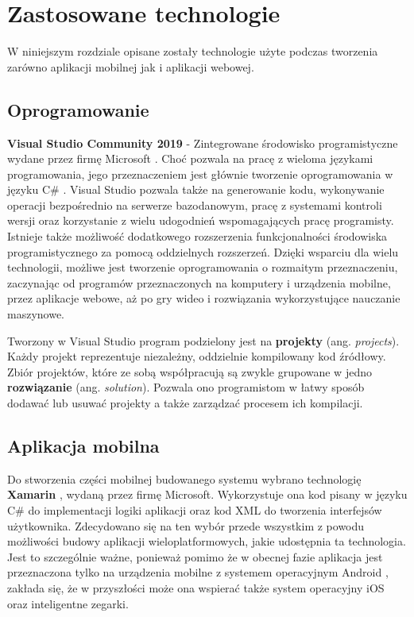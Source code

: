 \chapter{Zastosowane technologie}\label{chap:zastosowane-technologie}
W niniejszym rozdziale opisane zostały technologie użyte podczas tworzenia zarówno aplikacji mobilnej jak i aplikacji webowej.
\section{Oprogramowanie}
\textbf{Visual Studio Community 2019}\cite{visual-studio} - Zintegrowane środowisko programistyczne wydane przez firmę Microsoft \cite{microsoft}. Choć pozwala na pracę z wieloma językami programowania, jego przeznaczeniem jest głównie tworzenie oprogramowania w języku C\# \cite{csharp}. Visual Studio pozwala także na generowanie kodu, wykonywanie operacji bezpośrednio na serwerze bazodanowym, pracę z systemami kontroli wersji oraz korzystanie z wielu udogodnień wspomagających pracę programisty. Istnieje także możliwość dodatkowego rozszerzenia funkcjonalności środowiska programistycznego za pomocą oddzielnych rozszerzeń. Dzięki wsparciu dla wielu technologii, możliwe jest tworzenie oprogramowania o rozmaitym przeznaczeniu, zaczynając od programów przeznaczonych na komputery i urządzenia mobilne, przez aplikacje webowe, aż po gry wideo i rozwiązania wykorzystujące nauczanie maszynowe.

Tworzony w Visual Studio program podzielony jest na \textbf{projekty} (ang. \textit{projects}). Każdy projekt reprezentuje niezależny, oddzielnie kompilowany kod źródłowy. Zbiór projektów, które ze sobą współpracują są zwykle grupowane w jedno \textbf{rozwiązanie} (ang. \textit{solution}). Pozwala ono programistom w łatwy sposób dodawać lub usuwać projekty a także zarządzać procesem ich kompilacji.

\section{Aplikacja mobilna}
Do stworzenia części mobilnej budowanego systemu wybrano technologię \textbf{Xamarin} \cite{xamarin_docs}, wydaną przez firmę Microsoft. Wykorzystuje ona kod pisany w języku C\# do implementacji logiki aplikacji oraz kod XML \cite{xml} do tworzenia interfejsów użytkownika. Zdecydowano się na ten wybór przede wszystkim z powodu możliwości budowy aplikacji wieloplatformowych, jakie udostępnia ta technologia. Jest to szczególnie ważne, ponieważ pomimo że w obecnej fazie aplikacja jest przeznaczona tylko na urządzenia mobilne z systemem operacyjnym Android \cite{android}, zakłada się, że w przyszłości może ona wspierać także system operacyjny iOS \cite{ios} oraz inteligentne zegarki.

